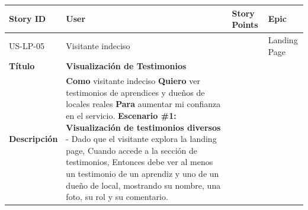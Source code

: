 {\def\LTcaptype{none} %
\begin{longtable}[]{@{}
  >{\raggedright\arraybackslash}p{}
  >{\raggedright\arraybackslash}p{}
  >{\raggedright\arraybackslash}p{}
  >{\raggedright\arraybackslash}p{}@{}}
\toprule\noalign{}
\begin{minipage}[b]{\linewidth}\raggedright
Story ID
\end{minipage} & \begin{minipage}[b]{\linewidth}\raggedright
User
\end{minipage} & \begin{minipage}[b]{\linewidth}\raggedright
Story Points
\end{minipage} & \begin{minipage}[b]{\linewidth}\raggedright
Epic
\end{minipage} \\
\midrule\noalign{}
\endhead
\bottomrule\noalign{}
\endlastfoot
US-LP-05 & Visitante indeciso & 3 & Landing Page \\
\textbf{Título} & \textbf{Visualización de Testimonios} & & \\
\textbf{Descripción} & \textbf{Como} visitante indeciso \textbf{Quiero}
ver testimonios de aprendices y dueños de locales reales \textbf{Para}
aumentar mi confianza en el servicio. \textbf{Escenario \#1:
Visualización de testimonios diversos} - Dado que el visitante explora
la landing page, Cuando accede a la sección de testimonios, Entonces
debe ver al menos un testimonio de un aprendiz y uno de un dueño de
local, mostrando su nombre, una foto, su rol y su comentario. & & \\
\end{longtable}
}

